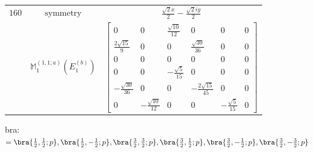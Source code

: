 \documentclass[fleqn,8pt,landscape]{jsarticle}
\begin{document}
\begin{longtable}{ccc}
$ 160 $ & $ \text{symmetry} $ & $ \frac{\sqrt{2} x}{2} - \frac{\sqrt{2} i y}{2} $ \\
$  $ & $ \mathbb{M}_{1}^{(1,1;a)}(E_{1}^{(b)}) $ & $ \begin{bmatrix} 0 & 0 & \frac{\sqrt{10}}{12} & 0 & 0 & 0 \\ \frac{2 \sqrt{15}}{9} & 0 & 0 & \frac{\sqrt{30}}{36} & 0 & 0 \\ 0 & 0 & 0 & 0 & 0 & 0 \\ 0 & 0 & - \frac{\sqrt{5}}{15} & 0 & 0 & 0 \\ - \frac{\sqrt{30}}{36} & 0 & 0 & - \frac{2 \sqrt{15}}{45} & 0 & 0 \\ 0 & - \frac{\sqrt{10}}{12} & 0 & 0 & - \frac{\sqrt{5}}{15} & 0 \end{bmatrix} $ \\ \hline
\end{longtable}
bra: $=\bra{\frac{1}{2},\frac{1}{2};p}, \bra{\frac{1}{2},- \frac{1}{2};p}, \bra{\frac{3}{2},\frac{3}{2};p}, \bra{\frac{3}{2},\frac{1}{2};p}, \bra{\frac{3}{2},- \frac{1}{2};p}, \bra{\frac{3}{2},- \frac{3}{2};p}$
\end{document}
